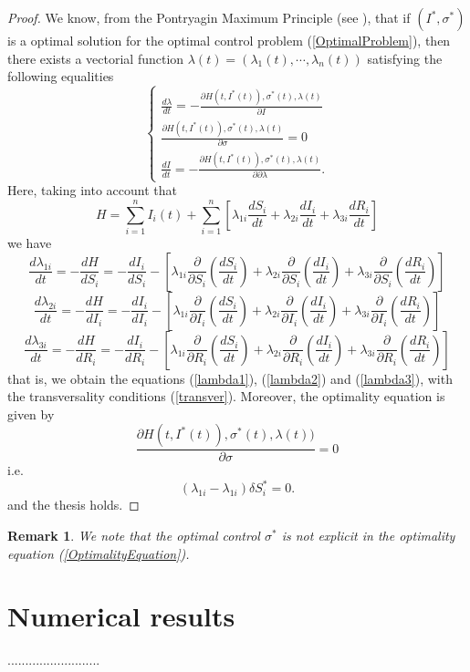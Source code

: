 \documentclass[a4paper,10pt]{article}
\newtheorem{rem}[thm]{Remark}
\theoremstyle{remark}
\begin{document}
\begin{proof}
We know, from the Pontryagin Maximum Principle (see \cite{Chen-2014}), that if $(I^{*}, \sigma^{*})$ is a optimal solution for the optimal control problem (\ref{OptimalProblem}), then there exists a vectorial function $\lambda(t)=(\lambda_{1}(t),\cdots,\lambda_{n}(t))$ satisfying the following equalities
\begin{equation*}
\left\{\begin{array}{l}\frac{d \lambda}{d t}=-\frac{\partial H(t,I^{*}(t)),\sigma^{*}(t),\lambda(t)}{\partial I}\\ 
\frac{\partial H(t,I^{*}(t)),\sigma^{*}(t),\lambda(t)}{\partial \sigma}=0 \\ 
\frac{d I}{d t}=-\frac{\partial H(t,I^{*}(t)),\sigma^{*}(t),\lambda(t)}{\partial \partial \lambda}.
\end{array}\right. 
\end{equation*}
Here, taking into account that
\[
H=\sum_{i=1}^{n} I_{i}(t)+\sum_{i=1}^{n} \left[\lambda_{1i}\frac{d S_{i}}{dt}+\lambda_{2i}\frac{d I_{i}}{dt}+\lambda_{3i}\frac{d R_{i}}{dt}\right] 
\]
we have
\[
\frac{d\lambda_{1i}}{dt}=-\frac{dH}{dS_{i}}=-\frac{dI_{i}}{dS_{i}}-\left[\lambda_{1i}\frac{\partial}{\partial S_{i}}(\frac{d S_{i}}{dt})+\lambda_{2i}\frac{\partial}{\partial S_{i}}(\frac{d I_{i}}{dt})+\lambda_{3i}\frac{\partial}{\partial S_{i}}(\frac{d R_{i}}{dt})\right] 
\]
\[
\frac{d\lambda_{2i}}{dt}=-\frac{dH}{dI_{i}}=-\frac{dI_{i}}{dI_{i}}-\left[\lambda_{1i}\frac{\partial}{\partial I_{i}}(\frac{d S_{i}}{dt})+\lambda_{2i}\frac{\partial}{\partial I_{i}}(\frac{d I_{i}}{dt})+\lambda_{3i}\frac{\partial}{\partial I_{i}}(\frac{d R_{i}}{dt})\right] 
\]
\[
\frac{d\lambda_{3i}}{dt}=-\frac{dH}{dR_{i}}=-\frac{dI_{i}}{dR_{i}}-\left[\lambda_{1i}\frac{\partial}{\partial R_{i}}(\frac{d S_{i}}{dt})+\lambda_{2i}\frac{\partial}{\partial R_{i}}(\frac{d I_{i}}{dt})+\lambda_{3i}\frac{\partial}{\partial R_{i}}(\frac{d R_{i}}{dt})\right] 
\]
that is, we obtain the equations (\ref{lambda1}), (\ref{lambda2}) and (\ref{lambda3}), with the transversality conditions (\ref{transver}). Moreover, the optimality equation is given by
\[
\frac{\partial H(t,I^{*}(t)),\sigma^{*}(t),\lambda(t))}{\partial\sigma}=0
\]
i.e.
\begin{equation*}
(\lambda_{1i}-\lambda_{1i})\delta S_{i}^{*}=0.
\end{equation*}
and the thesis holds.
\end{proof}


\begin{rem}
We note that the optimal control $\sigma^{*}$ is not explicit in the optimality equation (\ref{OptimalityEquation}).
\end{rem}







\section{Numerical results}  

..........................



  
  
\end{document}
